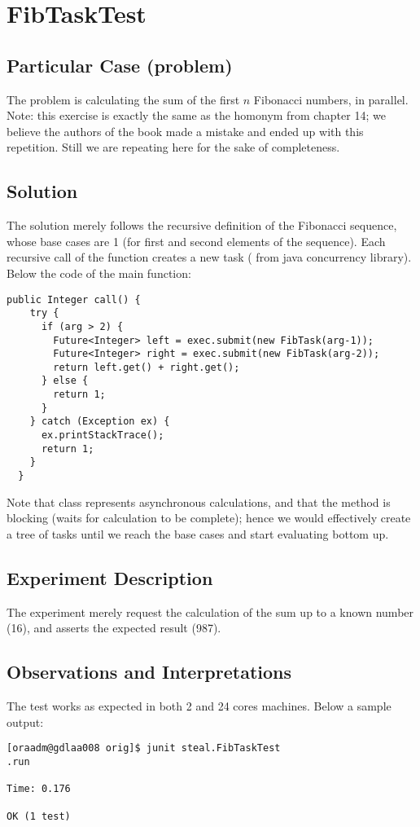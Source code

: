\section{\textbf{FibTaskTest}}

\subsection{Particular Case (problem)}
The problem is calculating the sum of the first $n$ Fibonacci numbers,
in parallel. \\

Note: this exercise is exactly the same as the homonym from chapter
14; we believe the authors of the book made a mistake and ended up
with this repetition. Still we are repeating here for the sake of
completeness.


\subsection{Solution}
The solution merely follows the recursive definition of the Fibonacci
sequence, whose base cases are 1 (for first and second elements of the
sequence). Each recursive call of the function creates a new task
( from java concurrency library). Below the code of the main
function: \\

\begin{lstlisting}[style=numbers]
  public Integer call() {
    try {
      if (arg > 2) {
        Future<Integer> left = exec.submit(new FibTask(arg-1));
        Future<Integer> right = exec.submit(new FibTask(arg-2));
        return left.get() + right.get();
      } else {
        return 1;
      }
    } catch (Exception ex) {
      ex.printStackTrace();
      return 1;
    }
  }
\end{lstlisting}
\hfill

Note that  class represents asynchronous calculations, and
that the  method is blocking (waits for calculation to be
complete); hence we would effectively create a  tree of tasks until we
reach the base cases and start evaluating bottom up.

\subsection{Experiment Description}
The experiment merely request the calculation of the sum up to a known
number (16), and asserts the expected result (987).

\subsection{Observations and Interpretations}
The test works as expected in both 2 and 24 cores machines. Below a
sample output: \\

\begin{verbatim}
[oraadm@gdlaa008 orig]$ junit steal.FibTaskTest
.run

Time: 0.176

OK (1 test)
\end{verbatim}
\hfill

